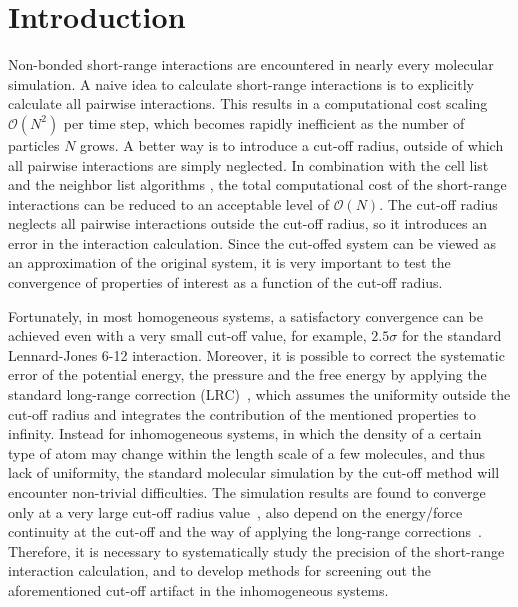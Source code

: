 \documentclass[aps, pre, preprint]{revtex4}
\begin{document}
\section{Introduction}
Non-bonded short-range interactions are encountered in nearly every
molecular simulation.  A naive idea to calculate short-range
interactions is to explicitly calculate all pairwise
interactions. This results in a computational cost scaling $\mathcal
O(N^2)$ per time step, which becomes rapidly inefficient as the number
of particles $N$ grows. A better way is to introduce a cut-off
radius, outside of which all pairwise interactions are simply
neglected. In combination with the cell list and the neighbor list
algorithms \cite{frenkel02b}, the total computational cost of the
short-range interactions can be reduced to an acceptable level of
$\mathcal O(N)$.  The cut-off radius neglects all pairwise interactions
outside the cut-off radius, so it introduces an error in the interaction
calculation. Since the cut-offed system can be viewed as an approximation of
the original system, it is very important to test the
convergence of properties of interest as a function of the cut-off
radius.

Fortunately,
in most homogeneous systems, a satisfactory convergence can be
achieved even with a very small cut-off value, for example,
$2.5\sigma$ for the standard Lennard-Jones 6-12 interaction.
Moreover, it is possible to correct the systematic error
of the potential energy, the pressure and the free energy by applying
the standard long-range correction (LRC)~\cite{allen87a}, which
assumes the uniformity outside the cut-off radius and integrates the
contribution of the mentioned properties to infinity. 
Instead for inhomogeneous systems, in which the density of a certain type of
atom may change within the length scale of a few molecules, 
and thus lack of uniformity, 
the standard molecular simulation 
by the cut-off method will encounter non-trivial
difficulties.
The simulation results are found to converge only at a very large
cut-off radius value~\cite{duque2004some, ismail2007application}, also
depend on the energy/force continuity at the cut-off and the way of
applying the long-range corrections~\cite{trokhymchuk1999computer,
  guo1997long, mecke1997molecular, janecek2006long, goujon2004monte,
  shen2007comparative}.  Therefore, it is necessary to systematically
study the precision of the short-range interaction calculation, and to
develop methods for screening out the aforementioned cut-off artifact in
the inhomogeneous systems.
\end{document}
